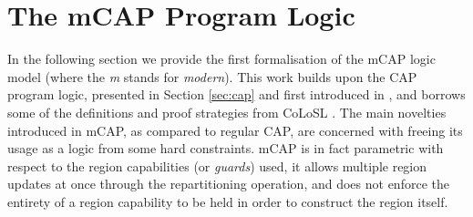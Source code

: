 \section{The mCAP Program Logic}

\label{sec:mcapModel}

In the following section we provide the first formalisation of the mCAP logic model (where the \textit{m} stands for \textit{modern}). This work builds upon the CAP program logic, presented in Section \ref{sec:cap} and first introduced in \cite{cap}, and borrows some of the definitions and proof strategies from CoLoSL \cite{colosl}. The main novelties introduced in mCAP, as compared to regular CAP, are concerned with freeing its usage as a logic from some hard constraints. mCAP is in fact parametric with respect to the region capabilities (or \textit{guards}) used, it allows multiple region updates at once through the repartitioning operation, and does not enforce the entirety of a region capability to be held in order to construct the region itself.



\newpage



\newpage

